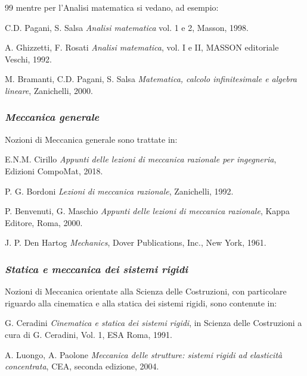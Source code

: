 \begin{thebibliography}{99}
	\vspace{0.3cm}
	\noindent mentre per l'Analisi matematica si vedano, ad esempio:
	
	C.D. Pagani, S. Salsa \emph{Analisi matematica} vol. 1 e 2, Masson, 1998.
	
	A. Ghizzetti, F. Rosati {\em Analisi matematica}, vol. I e II,
	MASSON editoriale Veschi, 1992.
	
	M. Bramanti, C.D. Pagani, S. Salsa \emph{Matematica, calcolo
		infinitesimale e algebra lineare}, Zanichelli, 2000.
	
	
	\subsubsection{\emph{Meccanica generale}}
	\noindent Nozioni di Meccanica generale sono trattate in:
	
	E.N.M. Cirillo \emph{Appunti delle lezioni di meccanica
		razionale per ingegneria}, Edizioni CompoMat, 2018.
	
	P. G. Bordoni \emph{Lezioni di meccanica razionale}, Zanichelli, 1992.
	
	P. Benvenuti, G. Maschio \emph{Appunti delle lezioni di meccanica
		razionale}, Kappa Editore, Roma, 2000.
	
	J. P. Den Hartog \emph{Mechanics}, Dover Publications, Inc., New York, 1961.
	
	
	\subsubsection{\emph{Statica e meccanica dei sistemi rigidi}}
	\noindent Nozioni di Meccanica orientate alla Scienza delle Costruzioni,
	con particolare riguardo alla cinematica e alla statica dei sistemi
	rigidi, sono contenute in:
	
	G. Ceradini {\em Cinematica e statica dei sistemi rigidi}, in Scienza
	delle Costruzioni a cura di G. Ceradini, Vol. 1, ESA Roma, 1991.
	
	A. Luongo, A. Paolone {\em Meccanica delle strutture: sistemi
		rigidi ad elasticit\`{a} concentrata}, CEA, seconda edizione, 2004.
	

\end{thebibliography}
